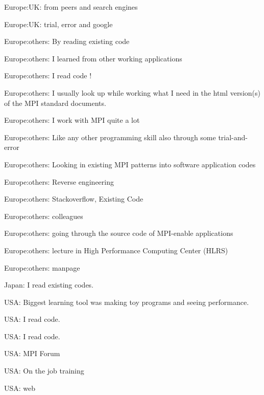 \item Europe:UK: from peers and search engines
\item Europe:UK: trial, error and google
\item Europe:others: By reading existing code
\item Europe:others: I learned from other working applications
\item Europe:others: I read code !
\item Europe:others: I usually look up while working what I need in the html version(s) of the MPI standard documents.
\item Europe:others: I work with MPI quite a lot
\item Europe:others: Like any other programming skill also through some trial-and-error
\item Europe:others: Looking in existing MPI patterns into software application codes
\item Europe:others: Reverse engineering
\item Europe:others: Stackoverflow, Existing Code
\item Europe:others: colleagues
\item Europe:others: going through the source code of MPI-enable applications
\item Europe:others: lecture in High Performance Computing Center (HLRS)
\item Europe:others: manpage
\item Japan: I read existing codes.
\item USA: Biggest learning tool was making toy programs and seeing performance.
\item USA: I read code.
\item USA: I read code.
\item USA: MPI Forum
\item USA: On the job training
\item USA: web
